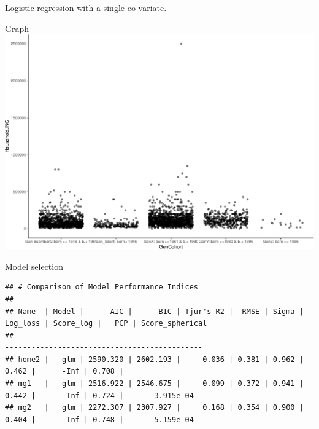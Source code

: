 \documentclass[
  ignorenonframetext,
]{beamer}
\begin{document}
\begin{frame}[fragile]{Logistic regression with a single co-variate.}
\begin{block}{Graph}
\protect\hypertarget{graph}{}
\includegraphics{slides_files/figure-beamer/unnamed-chunk-27-1.pdf}
\end{block}

\begin{block}{Model selection}
\protect\hypertarget{model-selection}{}
\begin{verbatim}
## # Comparison of Model Performance Indices
## 
## Name  | Model |      AIC |      BIC | Tjur's R2 |  RMSE | Sigma | Log_loss | Score_log |   PCP | Score_spherical
## ----------------------------------------------------------------------------------------------------------------
## home2 |   glm | 2590.320 | 2602.193 |     0.036 | 0.381 | 0.962 |    0.462 |      -Inf | 0.708 |                
## mg1   |   glm | 2516.922 | 2546.675 |     0.099 | 0.372 | 0.941 |    0.442 |      -Inf | 0.724 |       3.915e-04
## mg2   |   glm | 2272.307 | 2307.927 |     0.168 | 0.354 | 0.900 |    0.404 |      -Inf | 0.748 |       5.159e-04
\end{verbatim}
\end{block}


\end{frame}
\end{document}
